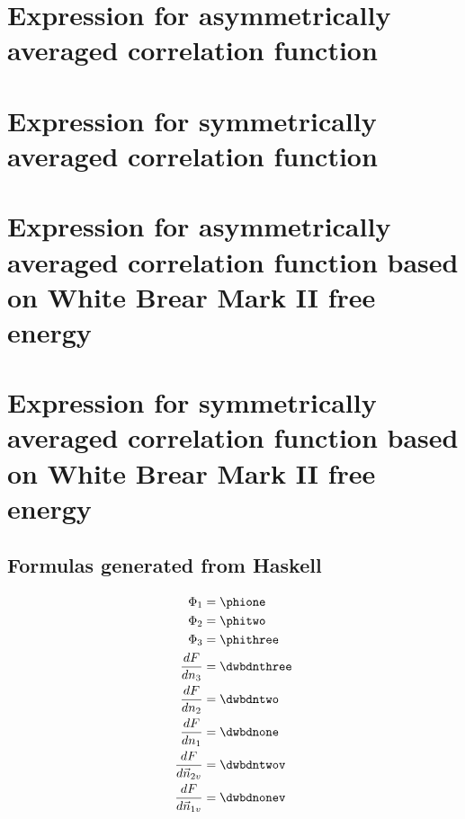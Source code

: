 \documentclass[letterpaper,twocolumn,amsmath,amssymb,jcp,10pt,aip]{revtex4-1}
\begin{document}
\section{Expression for asymmetrically averaged correlation
  function}\label{appendix:g-A}

\section{Expression for symmetrically averaged correlation
  function}\label{appendix:g-S}

\section{Expression for asymmetrically averaged correlation
  function based on White Brear Mark II free energy}\label{appendix:g-A-ii}

\section{Expression for symmetrically averaged correlation
  function based on White Brear Mark II free energy}\label{appendix:g-S-ii}



\begin{widetext}
\section{Formulas generated from Haskell}


\begin{align}
  \Phi_1 &= \phione \\
  \Phi_2 &= \phitwo \\
  \Phi_3 &= \phithree \\
  \frac{d F}{dn_3} &= \dwbdnthree \\
  \frac{d F}{dn_2} &= \dwbdntwo \\
  \frac{d F}{dn_1} &= \dwbdnone \\
  \frac{d F}{d\vec{n}_{2v}} &= \dwbdntwov \\
  \frac{d F}{d\vec{n}_{1v}} &= \dwbdnonev
\end{align}
\end{widetext}

\end{document}
